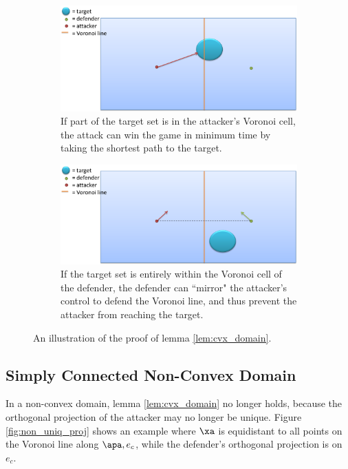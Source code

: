 \begin{figure}[h]
\centering
	\begin{subfigure}{0.45\textwidth}
	\centering
	\includegraphics[width=\textwidth]{"fig/cvx domain 1"}
	\caption{If part of the target set is in the attacker's Voronoi cell, the attack can win the game in minimum time by taking the shortest path to the target.}
	\end{subfigure} \quad
	\begin{subfigure}{0.45\textwidth}
	\centering
	\includegraphics[width=\textwidth]{"fig/cvx domain 2"}
	\caption{If the target set is entirely within the Voronoi cell of the defender, the defender can ``mirror" the attacker's control to defend the Voronoi line, and thus prevent the attacker from reaching the target.}
	\end{subfigure}
\caption{An illustration of the proof of lemma \ref{lem:cvx_domain}.}
\label{fig:cvx_domain}
\end{figure}

\subsection{Simply Connected Non-Convex Domain}
In a non-convex domain, lemma \ref{lem:cvx_domain} no longer holds, because the orthogonal projection of the attacker may no longer be unique. Figure \ref{fig:non_uniq_proj} shows an example where $\xa$ is equidistant to all points on the Voronoi line along $\apa,e_c$, while the defender's orthogonal projection is on $e_c$. 

